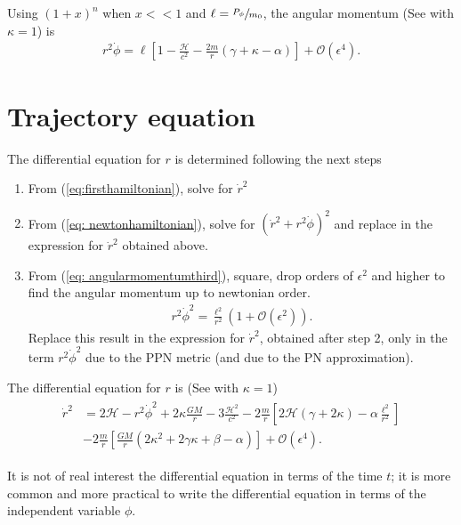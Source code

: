 Using $(1+x)^n$ when $x << 1$ and $\ell = \sfrac{P_{\phi}}{m_0}$, the angular momentum (See \cite{Brumberg} with $\kappa = 1$) is
\begin{align}
\label{eq: angularmomentumthird}
r^2\dot{\phi}=\ell\left[1-\frac{\mathcal{H}}{c^2}-\frac{2m}{r}\left(\gamma+\kappa-\alpha\right)\right]+\mathcal{O}(\epsilon^4).
\end{align}

\section{Trajectory equation}
The differential equation for $r$ is determined following the next steps
\begin{enumerate}
	\item From (\ref{eq:firsthamiltonian}), solve for $\dot{r}^2$
	\item From (\ref{eq: newtonhamiltonian}), solve for $(\dot{r}^2+r^2\dot{\phi})^2$ and replace in the expression for $\dot{r}^2$ obtained above.
	\item From (\ref{eq: angularmomentumthird}), square, drop orders of $\epsilon^2$ and higher to find the angular momentum up to newtonian order.
	 \begin{align} 
	 \label{eq: angularmomentumnewton}
	 r^2\dot{\phi}^2  = \frac{\ell^2}{r^2}(1+\mathcal{O}(\epsilon^2)).
	 \end{align}
	 Replace this result in the expression for $\dot{r}^2$, obtained after step 2, only in the term $r^2\dot{\phi}^2$ due to the PPN metric (and due to the PN approximation).
	 \end{enumerate}

The differential equation for $r$ is (See \cite{Brumberg} with $\kappa = 1$)
\begin{align}
\begin{split}
\label{eq:diffforr}
\dot{r}^2 &= 2\mathcal{H} - r^2\dot{\phi}^2 + 2\kappa\frac{GM}{r}-3\frac{\mathcal{H}^2}{c^2}-2\frac{m}{r}\left[2\mathcal{H}\left(\gamma+2\kappa\right)-\alpha\frac{\ell^2}{r^2}\right]\\
&-2\frac{m}{r}\left[\frac{GM}{r}\left(2\kappa^2 + 2\gamma\kappa + \beta-\alpha\right)\right]+\mathcal{O}(\epsilon^4).
\end{split}
\end{align}

It is not of real interest the differential equation in terms of the time $t$; it is more common and more practical to write the differential equation in terms of the independent variable $\phi$.\\

